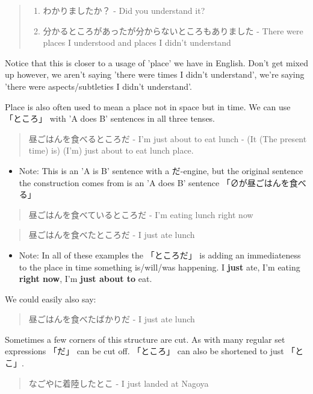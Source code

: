 \documentclass[11pt]{article}
\begin{document}
\begin{quote}
\begin{enumerate}
\item わかりましたか？ - Did you understand it?
\item 分かるところがあったが分からないところもありました - There were places I understood and places I didn't understand
\end{enumerate}
\end{quote}
Notice that this is closer to a usage of 'place' we have in English. Don't get mixed up however, we aren't saying 'there were times I didn't understand', we're saying 'there were aspects/subtleties I didn't understand'.

Place is also often used to mean a place not in space but in time. We can use 「ところ」 with 'A does B' sentences in all three tenses.
\begin{quote}
昼ごはんを食べるところだ - I'm just about to eat lunch - (It (The present time) is) (I'm) just about to eat lunch place.
\end{quote}
\begin{itemize}
\item Note: This is an 'A is B' sentence with a だ-engine, but the original sentence the construction comes from is an 'A does B' sentence 「∅が昼ごはんを食べる」
\end{itemize}

\begin{quote}
昼ごはんを食べているところだ - I'm eating lunch right now
\end{quote}
\begin{quote}
昼ごはんを食べたところだ - I just ate lunch
\end{quote}
\begin{itemize}
\item Note: In all of these examples the 「ところだ」 is adding an immediateness to the place in time something is/will/was happening. I \textbf{just} ate, I'm eating \textbf{right now}, I'm \textbf{just about to} eat.
\end{itemize}

We could easily also say:
\begin{quote}
昼ごはんを食べたばかりだ - I just ate lunch
\end{quote}

Sometimes a few corners of this structure are cut. As with many regular set expressions 「だ」 can be cut off. 「ところ」 can also be shortened to just 「とこ」.
\begin{quote}
なごやに着陸したとこ - I just landed at Nagoya
\end{quote}
\end{document}
